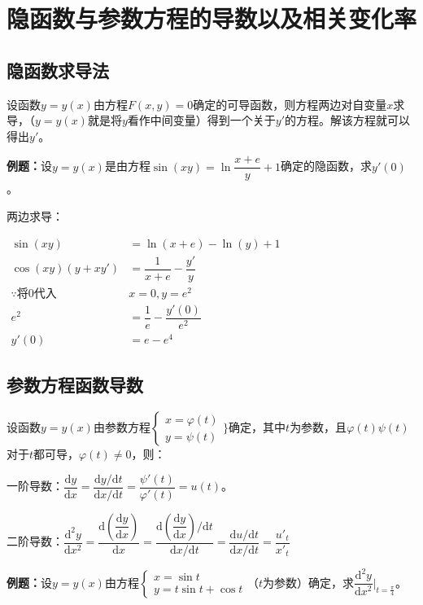 \documentclass[UTF8, 12pt]{ctexart}
\begin{document}
\section{隐函数与参数方程的导数以及相关变化率}

\subsection{隐函数求导法}

设函数$y=y(x)$由方程$F(x,y)=0$确定的可导函数，则方程两边对自变量$x$求导，（$y=y(x)$就是将$y$看作中间变量）得到一个关于$y'$的方程。解该方程就可以得出$y'$。

\textbf{例题：}设$y=y(x)$是由方程$\sin(xy)=\ln\dfrac{x+e}{y}+1$确定的隐函数，求$y'(0)$。

两边求导：

$
\begin{aligned}
    \sin(xy) &=\ln(x+e)-\ln(y)+1 \\
    \cos(xy)(y+xy') &=\dfrac{1}{x+e}-\dfrac{y'}{y} \\
    \because\text{将0代入} & x=0, y=e^2 \\
    e^2&=\dfrac{1}{e}-\dfrac{y'(0)}{e^2} \\
    y'(0) & =e-e^4
\end{aligned}
$

\subsection{参数方程函数导数}

设函数$y=y(x)$由参数方程$\left\{
    \begin{array}{l}
        x=\varphi(t) \\
        y=\psi(t)
    \end{array}
\}\right.$确定，其中$t$为参数，且$\varphi(t)\psi(t)$对于$t$都可导，$\varphi(t)\neq 0$，则：

\medskip

一阶导数：$\dfrac{\textrm{d}y}{\textrm{d}x}=\dfrac{\textrm{d}y/\textrm{d}t}{\textrm{d}x/\textrm{d}t}=\dfrac{\psi'(t)}{\varphi'(t)}=u(t)$。

二阶导数：$\dfrac{\textrm{d}^2y}{\textrm{d}x^2}=\dfrac{\textrm{d}\left(\dfrac{\textrm{d}y}{\textrm{d}x}\right)}{\textrm{d}x}=\dfrac{\textrm{d}\left(\dfrac{\textrm{d}y}{\textrm{d}x}\right)/\textrm{d}t}{\textrm{d}x/\textrm{d}t}=\dfrac{\textrm{d}u/\textrm{d}t}{\textrm{d}x/\textrm{d}t}=\dfrac{u'_t}{x'_t}$

\textbf{例题：}设$y=y(x)$由方程$\left\{
\begin{array}{l}
    x=\sin t \\
    y=t\sin t+\cos t
\end{array}
\right.
$（$t$为参数）确定，求$\dfrac{\textrm{d}^2y}{\textrm{d}x^2}\vert_{t=\frac{\pi}{4}}$。
\end{document}
